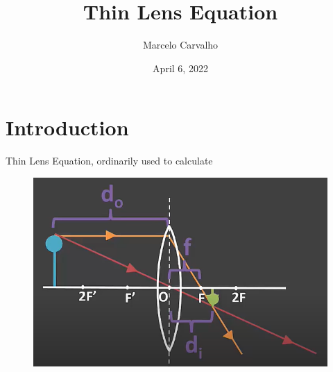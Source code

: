 \documentclass{article}
\author{Marcelo Carvalho}
\date{April 6, 2022}
\title{Thin Lens Equation}
\begin{document}
\maketitle

\section{Introduction}
    Thin Lens Equation, ordinarily used to calculate  
\begin{figure}[h]
    \includegraphics[scale=0.5]{images/thin_lens_schematic.png}
\end{figure}
\end{document}
